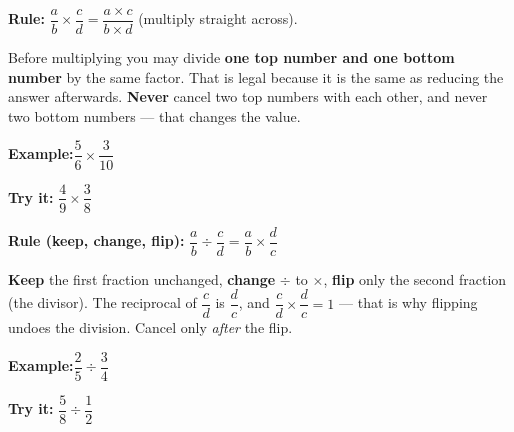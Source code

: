 \documentclass[12pt]{article}
\begin{document}

\begin{formulabox}\textbf{Rule:}\quad
$\dfrac{a}{b} \times \dfrac{c}{d} = \dfrac{a \times c}{b \times d}$ \quad
(multiply straight across).\par
Before multiplying you may divide \textbf{one top number and one bottom
number} by the same factor. That is legal because it is the same as reducing
the answer afterwards. \textbf{Never} cancel two top numbers with each other,
and never two bottom numbers --- that changes the value.
\end{formulabox}
\begin{examplebox}\textbf{Example:}\quad $\dfrac{5}{6} \times \dfrac{3}{10}$
\end{examplebox}
\begin{tryitbox}\textbf{Try it:}\quad
$\dfrac{4}{9} \times \dfrac{3}{8}$\\[2pt]
\end{tryitbox}

\begin{formulabox}\textbf{Rule (keep, change, flip):}\quad
$\dfrac{a}{b} \div \dfrac{c}{d} = \dfrac{a}{b} \times \dfrac{d}{c}$\par
\textbf{Keep} the first fraction unchanged, \textbf{change} $\div$ to
$\times$, \textbf{flip} only the second fraction (the divisor). The reciprocal
of $\dfrac{c}{d}$ is $\dfrac{d}{c}$, and $\dfrac{c}{d} \times \dfrac{d}{c} =
1$ --- that is why flipping undoes the division. Cancel only \emph{after} the
flip.
\end{formulabox}
\begin{examplebox}\textbf{Example:}\quad $\dfrac{2}{5} \div \dfrac{3}{4}$
\end{examplebox}
\begin{tryitbox}\textbf{Try it:}\quad
$\dfrac{5}{8} \div \dfrac{1}{2}$\\[2pt]
\end{tryitbox}
\end{document}
